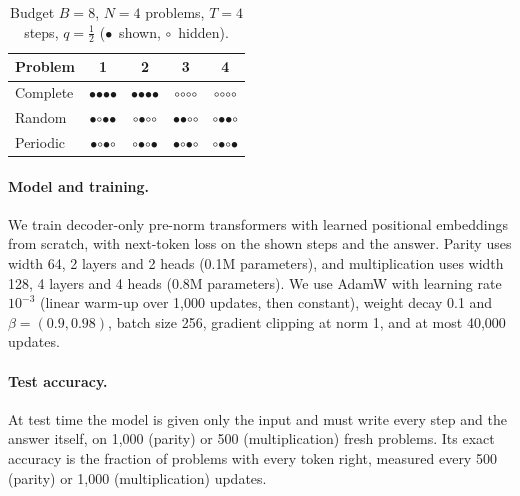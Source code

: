 \documentclass{article}
\newcommand{\Nprob}{N}      %
\newcommand{\Bud}{B}        %
\newcommand{\shown}{$\bullet$}
\newcommand{\hidden}{$\circ$}
\begin{document}
\begin{table}[h]
  \caption{Budget $\Bud=8$, $\Nprob=4$ problems, $T=4$ steps,
  $q=\tfrac12$ (\shown\ shown, \hidden\ hidden).}
  \label{tab:arms}
  \centering\small
  \begin{tabular}{@{}lcccc@{}}
    \toprule
    Problem  & 1 & 2 & 3 & 4 \\
    \midrule
    Complete & \shown\shown\shown\shown & \shown\shown\shown\shown & \hidden\hidden\hidden\hidden & \hidden\hidden\hidden\hidden \\
    Random   & \shown\hidden\shown\shown & \hidden\shown\hidden\hidden & \shown\shown\hidden\hidden & \hidden\shown\shown\hidden \\
    Periodic & \shown\hidden\shown\hidden & \hidden\shown\hidden\shown & \shown\hidden\shown\hidden & \hidden\shown\hidden\shown \\
    \bottomrule
  \end{tabular}
\end{table}

\paragraph{Model and training.}
We train decoder-only pre-norm transformers with learned positional
embeddings from scratch, with next-token loss on the shown steps and the
answer. Parity uses width 64, 2 layers and 2 heads (0.1M parameters),
and multiplication uses width 128, 4 layers and 4 heads (0.8M parameters).
We use AdamW with learning rate $10^{-3}$ (linear warm-up over 1{,}000
updates, then constant), weight decay 0.1 and
$\beta=(0.9,0.98)$, batch size 256, gradient clipping at norm 1, and at most
40{,}000 updates.

\paragraph{Test accuracy.}
At test time the model is given only the input and must write every step and
the answer itself, on 1{,}000 (parity) or 500 (multiplication) fresh
problems. Its exact accuracy is the fraction of problems with every token
right, measured every 500 (parity) or 1{,}000 (multiplication) updates.
\end{document}

